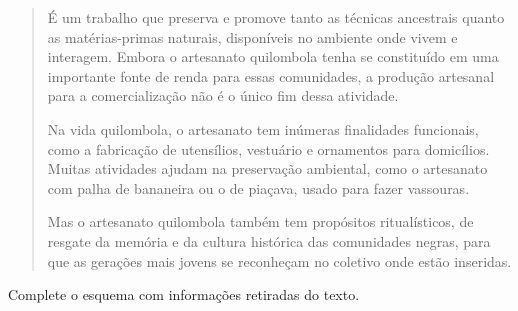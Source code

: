 \begin{escolha}
\begin{quote}
É um trabalho que preserva e promove tanto as técnicas ancestrais quanto
as matérias-primas naturais, disponíveis no ambiente onde vivem e
interagem. Embora o artesanato quilombola tenha se constituído em uma
importante fonte de renda para essas comunidades, a produção artesanal
para a comercialização não é o único fim dessa atividade.

Na vida quilombola, o artesanato tem inúmeras finalidades funcionais,
como a fabricação de utensílios, vestuário e ornamentos para domicílios.
Muitas atividades ajudam na preservação ambiental, como o artesanato com
palha de bananeira ou o de piaçava, usado para fazer vassouras.

Mas o artesanato quilombola também tem propósitos ritualísticos, de
resgate da memória e da cultura histórica das comunidades negras, para
que as gerações mais jovens se reconheçam no coletivo onde estão
inseridas.

\end{quote}

Complete o esquema com informações retiradas do texto.


\end{escolha}
